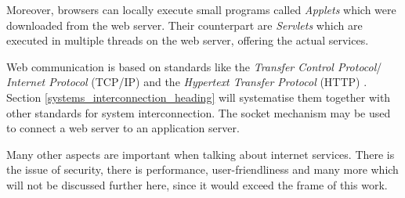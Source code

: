Moreover, browsers can locally execute small programs called \emph{Applets}
which were downloaded from the web server. Their counterpart are \emph{Servlets}
which are executed in multiple threads on the web server, offering the actual
services.

Web communication is based on standards like the \emph{Transfer Control Protocol}/
\emph{Internet Protocol} (TCP/IP) and the \emph{Hypertext Transfer Protocol}
(HTTP) \cite{tanenbaum2000}. Section \ref{systems_interconnection_heading} will
systematise them together with other standards for system interconnection. The
socket mechanism may be used to connect a web server to an application server.

Many other aspects are important when talking about internet services. There is
the issue of security, there is performance, user-friendliness and many more
which will not be discussed further here, since it would exceed the frame of
this work.
